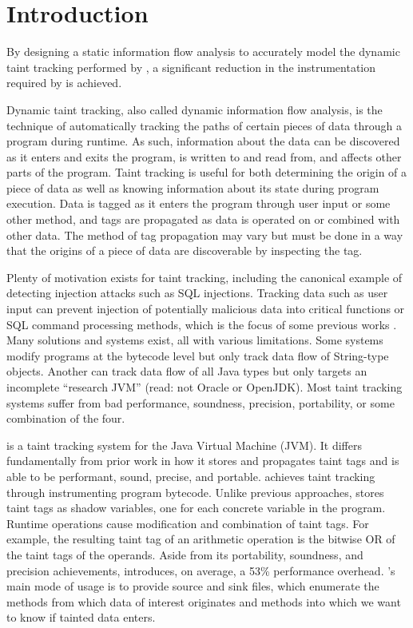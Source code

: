 \chapter{Introduction}

By designing a static information flow analysis to accurately model
the dynamic taint tracking performed by \phosphor{}, a significant
reduction in the instrumentation required by \phosphor{} is achieved.

Dynamic taint tracking, also called dynamic information flow analysis,
is the technique of automatically tracking the paths of certain pieces
of data through a program during runtime. As such, information about
the data can be discovered as it enters and exits the program, is
written to and read from, and affects other parts of the
program. Taint tracking is useful for both determining the origin of a
piece of data as well as knowing information about its state during
program execution. Data is tagged as it enters the program through
user input or some other method, and tags are propagated as data is
operated on or combined with other data. The method of tag propagation
may vary but must be done in a way that the origins of a piece of data
are discoverable by inspecting the tag.

Plenty of motivation exists for taint tracking, including the
canonical example of detecting injection attacks such as SQL
injections. Tracking data such as user input can prevent injection of
potentially malicious data into critical functions or SQL command
processing methods, which is the focus of some previous works
\cite{sql1} \cite{sql2}. Many solutions and systems exist, all with
various limitations. Some systems \cite{stringtaint} \cite{sql1} modify
programs at the bytecode level but only track data flow of String-type
objects. Another \cite{jikes} can track data flow of all Java types
but only targets an incomplete ``research JVM'' (read: not Oracle or
OpenJDK).  Most taint tracking systems suffer from bad performance,
soundness, precision, portability, or some combination of the four.

\phosphor{} \cite{phosphor_oopsla} is a taint tracking system for the
Java Virtual Machine (JVM). It differs fundamentally from prior work
in how it stores and propagates taint tags and is able to be
performant, sound, precise, and portable. \phosphor{} achieves taint
tracking through instrumenting program bytecode. Unlike previous
approaches, \phosphor{} stores taint tags as shadow variables, one for
each concrete variable in the program. Runtime operations cause
modification and combination of taint tags. For example, the resulting
taint tag of an arithmetic operation is the bitwise OR of the taint
tags of the operands. Aside from its portability, soundness, and
precision achievements, \phosphor{} introduces, on average, a 53\%
performance overhead. \phosphor{}'s main mode of usage is to provide
source and sink files, which enumerate the methods from which data of
interest originates and methods into which we want to know if tainted
data enters.

